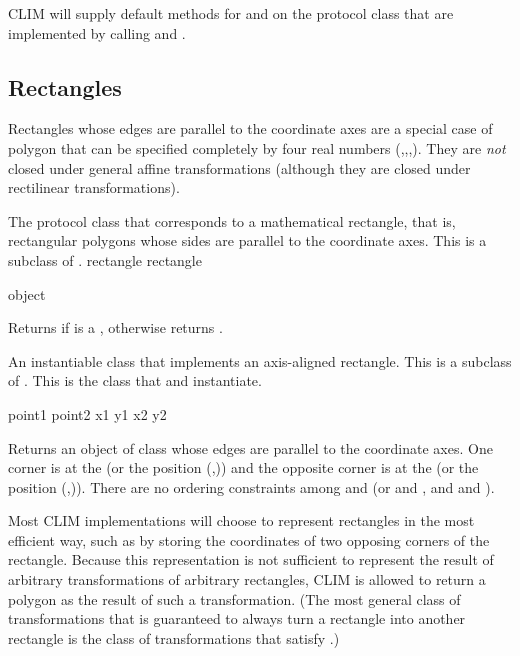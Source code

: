 CLIM will supply default methods for  and
 on the protocol class  that are implemented by
calling  and .


\subsection {Rectangles} 
\label {rect}

Rectangles whose edges are parallel to the coordinate axes are a special case of
polygon that can be specified completely by four real numbers
(,,,).  They are {\sl not} closed under general
affine transformations (although they are closed under rectilinear
transformations).


The protocol class that corresponds to a mathematical rectangle, that is,
rectangular polygons whose sides are parallel to the coordinate axes.  This is a
subclass of .
 {rectangle} {rectangle}

 {object}

Returns  if  is a , otherwise returns
.


An instantiable class that implements an axis-aligned rectangle.  This is a
subclass of .  This is the class that  and
 instantiate.
\Immutable

  {point1 point2}
 {x1 y1 x2 y2}

Returns an object of class  whose edges are parallel to
the coordinate axes.  One corner is at the   (or the
position (,)) and the opposite corner is at the 
 (or the position (,)).  There are no ordering
constraints among  and  (or  and , and
 and ).

Most CLIM implementations will choose to represent rectangles in the most
efficient way, such as by storing the coordinates of two opposing corners of the
rectangle.  Because this representation is not sufficient to represent the
result of arbitrary transformations of arbitrary rectangles, CLIM is allowed to
return a polygon as the result of such a transformation.  (The most general
class of transformations that is guaranteed to always turn a rectangle into
another rectangle is the class of transformations that satisfy
.)

